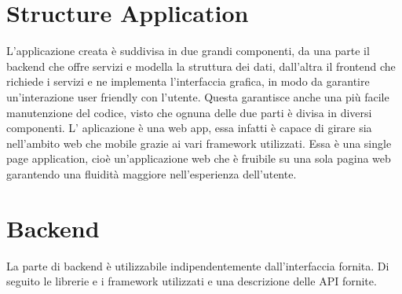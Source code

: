 \documentclass{article}
\begin{document}
\section{Structure Application}
L'applicazione creata è suddivisa in due grandi componenti, da una parte il backend che offre servizi e modella la struttura dei dati, dall'altra il frontend che richiede i servizi e ne implementa l'interfaccia grafica, in modo da garantire un'interazione user friendly con l'utente.
Questa garantisce anche una più facile manutenzione del codice, visto che ognuna delle due parti è divisa in diversi componenti.
L' aplicazione è una web app, essa infatti è capace di girare sia nell'ambito web che mobile grazie ai vari framework utilizzati.
Essa è una single page application, cioè un'applicazione web che è fruibile su una sola pagina web garantendo una fluidità maggiore nell'esperienza dell'utente.
\section{Backend}
La parte di backend è utilizzabile indipendentemente dall'interfaccia fornita. Di seguito le librerie e i framework utilizzati e una descrizione delle API fornite. 
\end{document}
